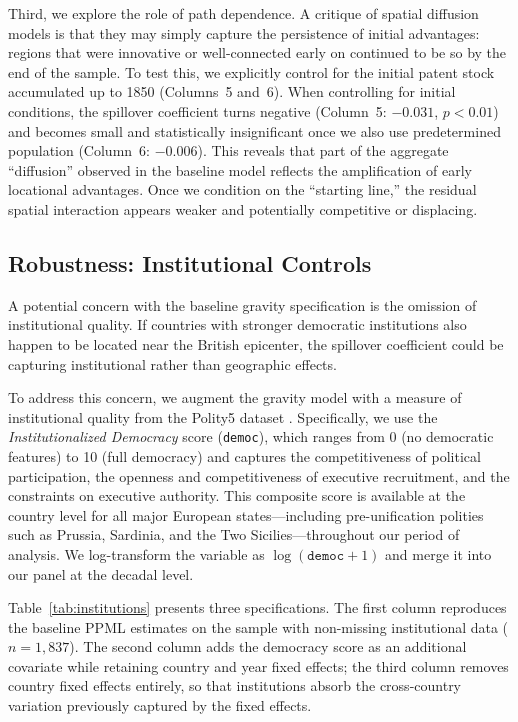 \documentclass[letterpaper,12pt,leqno]{article}
\begin{document}
Third, we explore the role of path dependence. A critique of spatial diffusion models is that they may simply capture the persistence of initial advantages: regions that were innovative or well-connected early on continued to be so by the end of the sample. To test this, we explicitly control for the initial patent stock accumulated up to 1850 (Columns~5 and~6).
When controlling for initial conditions, the spillover coefficient turns negative (Column~5: \(-0.031\), \(p < 0.01\)) and becomes small and statistically insignificant once we also use predetermined population (Column~6: \(-0.006\)). This reveals that part of the aggregate ``diffusion'' observed in the baseline model reflects the amplification of early locational advantages. Once we condition on the ``starting line,'' the residual spatial interaction appears weaker and potentially competitive or displacing.

\subsection{Robustness: Institutional Controls}

A potential concern with the baseline gravity specification is the omission of institutional quality. If countries with stronger democratic institutions also happen to be located near the British epicenter, the spillover coefficient could be capturing institutional rather than geographic effects.

To address this concern, we augment the gravity model with a measure of institutional quality from the Polity5 dataset \citep{marshall2019polity}. Specifically, we use the \emph{Institutionalized Democracy} score (\texttt{democ}), which ranges from 0 (no democratic features) to 10 (full democracy) and captures the competitiveness of political participation, the openness and competitiveness of executive recruitment, and the constraints on executive authority. This composite score is available at the country level for all major European states---including pre-unification polities such as Prussia, Sardinia, and the Two Sicilies---throughout our period of analysis. We log-transform the variable as \(\log(\texttt{democ} + 1)\) and merge it into our panel at the decadal level.



Table~\ref{tab:institutions} presents three specifications. The first column reproduces the baseline PPML estimates on the sample with non-missing institutional data (\(n = 1{,}837\)). The second column adds the democracy score as an additional covariate while retaining country and year fixed effects; the third column removes country fixed effects entirely, so that institutions absorb the cross-country variation previously captured by the fixed effects.
\end{document}
